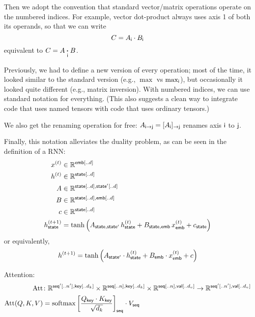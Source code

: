 \documentclass{article}
\DeclareMathOperator*{\softmax}{softmax}
\begin{document}
Then we adopt the convention that standard vector/matrix operations operate on the numbered indices. For example, vector dot-product always uses axis 1 of both its operands, so that we can write
\begin{equation*}
C = A_{\mathsf{i}} \cdot B_{\mathsf{i}}
\end{equation*}
equivalent to $C = A \mathbin{\mathop{\boldsymbol\cdot}\limits_{\mathsf{i}}} B$. 

Previously, we had to define a new version of every operation; most of the time, it looked similar to the standard version (e.g., $\max$ vs $\max_{\mathsf{i}}$), but occasionally it looked quite different (e.g., matrix inversion). With numbered indices, we can use standard notation for everything.
(This also suggests a clean way to integrate code that uses named tensors with code that uses ordinary tensors.)

We also get the renaming operation for free: $A_{\mathsf{i}\rightarrow\mathsf{j}} = [A_{\mathsf{i}}]_{\rightarrow\mathsf{j}}$ renames axis $\mathsf{i}$ to $\mathsf{j}$.

Finally, this notation alleviates the duality problem, as can be seen in the definition of a RNN:
\begin{align*}
x^{(t)} &\in \mathbb{R}^{\mathsf{emb}[..d]} \\
h^{(t)} &\in \mathbb{R}^{\mathsf{state}[..d]} \\
A &\in \mathbb{R}^{\mathsf{state}[..d], \mathsf{state'}[..d]} \\
B &\in \mathbb{R}^{\mathsf{state}[..d], \mathsf{emb}[..d]} \\
c &\in \mathbb{R}^{\mathsf{state}[..d]} \\
h^{(t+1)}_{\mathsf{state}} &= \tanh\left( A_{\mathsf{state},\mathsf{state'}} \, h^{(t)}_{\mathsf{state}} + B_{\mathsf{state},\mathsf{emb}} \, x^{(t)}_{\mathsf{emb}} + c_{\mathsf{state}} \right)
\end{align*}
or equivalently,
\begin{equation*}
h^{(t+1)} = \tanh\left( A_{\mathsf{state'}} \cdot h^{(t)}_{\mathsf{state}} + B_{\mathsf{emb}} \cdot x^{(t)}_{\mathsf{emb}} + c \right)
\end{equation*}

Attention:
\begin{align*}
  \text{Att} &\colon \mathbb{R}^{\nset{seq'}{..n'},\nset{key}{..d_k}} \times \mathbb{R}^{\nset{seq}{..n},\nset{key}{..d_k}} \times \mathbb{R}^{\nset{seq}{..n},\nset{val}{..d_v}} \rightarrow \mathbb{R}^{\nset{seq'}{..n'},\nset{val}{..d_v}} \\
  \text{Att}(Q,K,V) &= \softmax \left[ \frac{Q_{\name{key}} \cdot K_\name{key}}{\sqrt{d_k}} \right]_{\name{seq}} \cdot V_{\name{seq}}
\end{align*}
\end{document}
